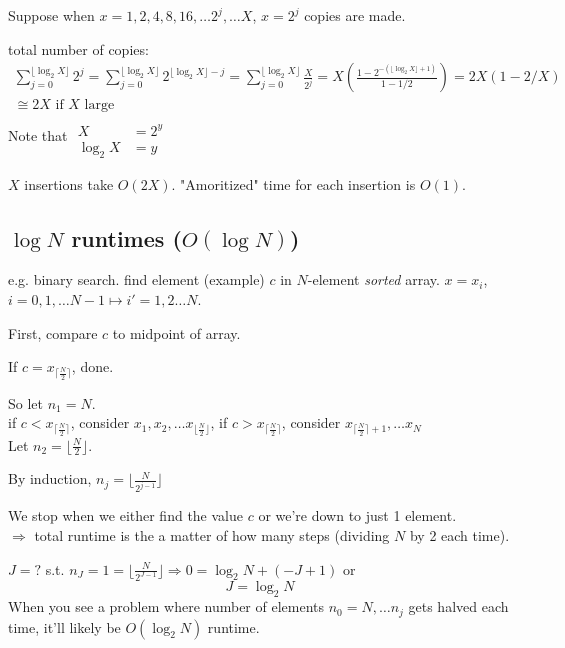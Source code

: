 \documentclass[10pt]{amsart}
\begin{document}
Suppose when $x=1, 2, 4, 8, 16, \dots 2^j, \dots X$, $x= 2^j$ copies are made. 

total number of copies:
\[
\begin{gathered}
\sum_{j=0}^{ \lfloor \log_2{X} \rfloor } 2^j = \sum_{j=0}^{ \lfloor \log_2{X} \rfloor } 2^{ \lfloor \log_2{X} \rfloor - j} = \sum_{j=0}^{ \lfloor \log_2{X} \rfloor } \frac{X}{2^j} = X\left( \frac{ 1 - 2^{ - (\lfloor \log_2{X} \rfloor  + 1)} }{ 1 - 1/2} \right) = 2X \left( 1 - 2/X \right) \\
\cong 2X \text{ if $X$ large } 
\end{gathered}
\]
Note that $\begin{aligned} & \quad \\ 
X & = 2^y \\ 
\log_2{X} & = y \end{aligned}$ 

$X$ insertions take $O(2X)$.  "Amoritized" time for each insertion is $O(1)$.

\subsection{$\log{N}$ runtimes ($O(\log{N})$)} 

e.g. binary search. find element (example) $c$ in $N$-element \emph{sorted} array. $x= x_i$, $i=0,1, \dots N-1 \mapsto i' = 1, 2 \dots N$. 

First, compare $c$ to midpoint of array. 

If $c= x_{ \lceil \frac{N}{2} \rceil }$, done.

So let $n_1 =N$.  \\

if $c< x_{ \lceil \frac{N}{2} \rceil }$, consider $x_1, x_2, \dots x_{ \lfloor \frac{N}{2} \rfloor }$, if $c> x_{ \lceil \frac{N}{2} \rceil }$, consider $x_{ \lceil \frac{N}{2} \rceil + 1},  \dots x_N$ \\

Let $n_2= \lfloor \frac{N}{2} \rfloor$. 

By induction, $n_j = \lfloor \frac{N}{2^{j-1}} \rfloor$

We stop when we either find the value $c$ or we're down to just 1 element. \\
$\Longrightarrow $ total runtime is the a matter of how many steps (dividing $N$ by 2 each time).

$J = ?$ s.t. $n_J = 1 = \lfloor \frac{N}{2^{J-1}} \rfloor \Longrightarrow  0 = \log_2{N} + (-J + 1)$ or 
\[
J = \log_2{N}
\]
When you see a problem where number of elements $n_0 = N, \dots n_j$ gets halved each time, it'll likely be $O(\log_2{N})$ runtime. 
\end{document}
